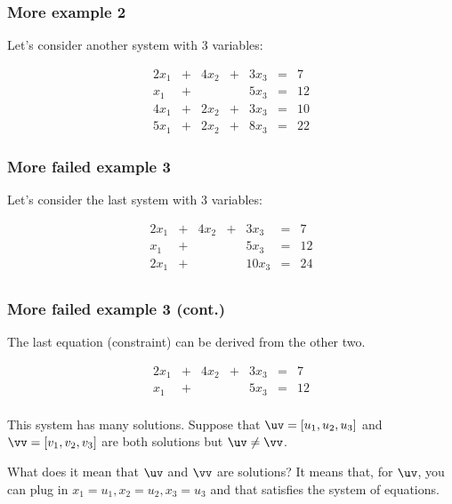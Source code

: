 \begin{frame}
  \frametitle{More example 2}
  Let's consider another system with 3 variables:

  \[
  \begin{array}{rcrcrcl}
    2x_1 & + & 4x_2 & + & 3x_3 & = & 7 \\
    x_1 & + &  &  & 5x_3 & = & 12 \\
    4x_1 & + & 2x_2 & + & 3x_3 & = & 10 \\
    5x_1 & + & 2x_2 & + & 8x_3 & = & 22
  \end{array}
  \]

  \vspace{2in}

\end{frame}

\begin{frame}
  \frametitle{More failed example 3}
  Let's consider the last system with 3 variables:

  \[
  \begin{array}{rcrcrcl}
    2x_1 & + & 4x_2 & + & 3x_3 & = & 7 \\
    x_1 & + &  &  & 5x_3 & = & 12 \\
    2x_1 & + &  &  & 10x_3 & = & 24 \\
  \end{array}
  \]

  \vspace{2in}

\end{frame}

\begin{frame}
  \frametitle{More failed example 3 (cont.)}
  The last equation (constraint) can be derived from the other two.
  
  \[
  \begin{array}{rcrcrcl}
    2x_1 & + & 4x_2 & + & 3x_3 & = & 7 \\
    x_1 & + &  &  & 5x_3 & = & 12 \\
  \end{array}
  \]

  \pause

  This system has many solutions. \pause Suppose that
  $\uv=[u_1,u_2,u_3]$ and $\vv=[v_1,v_2,v_3]$ are both solutions but
  $\uv\neq\vv$.

  \pause

  What does it mean that $\uv$ and $\vv$ are solutions? \pause It
  means that, for $\uv$, you can plug in $x_1=u_1, x_2=u_2, x_3=u_3$
  and that satisfies the system of equations.
  
  \vspace{1in}
  
\end{frame}

